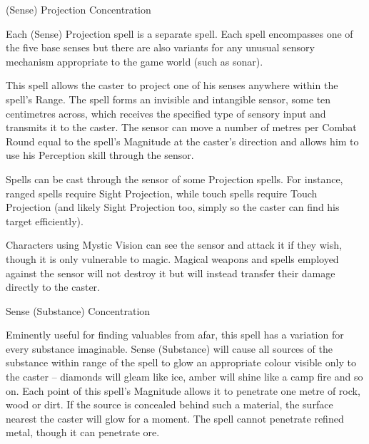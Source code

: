 \begin{rpg-spell}
{(Sense) Projection}
{Concentration}

Each (Sense) Projection spell is a separate spell. Each spell encompasses one of the five base senses but there are also variants for any unusual sensory mechanism appropriate to the game world (such as sonar). 

This spell allows the caster to project one of his senses anywhere within the spell’s Range. The spell forms an invisible and intangible sensor, some ten centimetres across, which receives the specified type of sensory input and transmits it to the caster. The sensor can move a number of metres per Combat Round equal to the spell’s Magnitude at the caster’s direction and allows him to use his Perception skill through the sensor. 

Spells can be cast through the sensor of some Projection spells. For instance, ranged spells require Sight Projection, while touch spells require Touch Projection (and likely Sight Projection too, simply so the caster can find his target efficiently). 

Characters using Mystic Vision can see the sensor and attack it if they wish, though it is only vulnerable to magic. Magical weapons and spells employed against the sensor will not destroy it but will instead transfer their damage directly to the caster.
\end{rpg-spell}


\begin{rpg-spell}
{Sense (Substance)}
{Concentration}

Eminently useful for finding valuables from afar, this spell has a variation for every substance imaginable. Sense (Substance) will cause all sources of the substance within range of the spell to glow an appropriate colour visible only to the caster – diamonds will gleam like ice, amber will shine like a camp fire and so on. Each point of this spell’s Magnitude allows it to penetrate one metre of rock, wood or dirt. If the source is concealed behind such a material, the surface nearest the caster will glow for a moment. The spell cannot penetrate refined metal, though it can penetrate ore. 
\end{rpg-spell}


